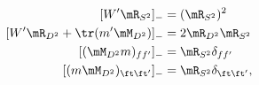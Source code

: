 \begin{equation}
 \begin{split}
 [W'\mR_{S^2}]_- &= (\mR_{S^2}{})^2
 \\
 [W'\mR_{D^2}+\tr(m'\mM_{D^2})]_-  &= 2\mR_{D^2} \mR_{S^2}
 \\
 [(\mM_{D^2} m)_{ff'}]_-     &= \mR_{S^2} \delta_{ff'}
  \\
 [(m \mM_{D^2})_{\ft\ft'}]_- &= \mR_{S^2} \delta_{\ft \ft'} ,
\end{split}
\label{eq:loop_eq_mm_U(N)}
\end{equation}

